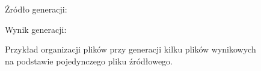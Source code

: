 \begin{figure}[!ht]
Źródło generacji:


Wynik generacji:


\caption{Przykład organizacji plików przy generacji kilku plików wynikowych na podstawie pojedynczego pliku źródłowego.}
\label{fig:implementation_core:singleSourceFile}
\end{figure}
